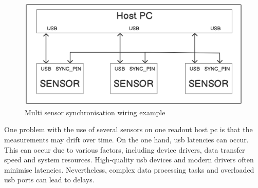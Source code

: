 \begin{figure}
\centering
\includegraphics{./generated_images/border_Multi_sensor_synchronisation_wiring_example.png}
\caption{Multi sensor synchronisation wiring example
\label{Multi_sensor_synchronisation_wiring_example.png}}
\end{figure}

One problem with the use of several sensors on one readout host \gls{pc}
is that the measurements may drift over time. On the one hand, \gls{usb}
latencies can occur. This can occur due to various factors, including
device drivers, data transfer speed and system resources. High-quality
\gls{usb} devices and modern drivers often minimise latencies.
Nevertheless, complex data processing tasks and overloaded \gls{usb}
ports can lead to delays.

